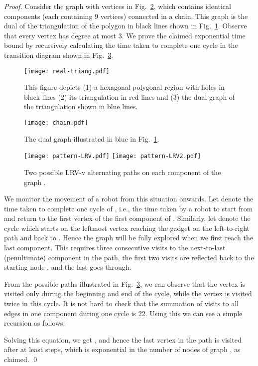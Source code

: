 \begin{proof}
Consider the graph  with  vertices in Fig.~\ref{GD-LRV}, which contains
 identical components (each containing 9 vertices) connected in a chain.
This graph is the dual of the triangulation of the polygon in black lines shown in Fig.~\ref{triang-LRV}.
Observe that every vertex has degree at most 3.
We prove the claimed exponential time bound by recursively calculating the time taken to complete one cycle in the transition
diagram shown in Fig.~\ref{LRV}.

\begin{figure}[t]\centering
\texttt{[image: real-triang.pdf]}
\caption{This figure depicts (1) a hexagonal polygonal region with holes in black lines (2) its triangulation  in red lines
and (3) the dual graph of the triangulation  shown in blue lines.} \label{triang-LRV}
 \end{figure}

\begin{figure}[h]\centering
\texttt{[image: chain.pdf]}
\caption{The dual graph  illustrated in blue in Fig.~\ref{triang-LRV}.} \label{GD-LRV}
 \end{figure}


\begin{figure}[h]\centering
\texttt{[image: pattern-LRV.pdf]}
\texttt{[image: pattern-LRV2.pdf]}
\caption{Two possible LRV-v alternating paths on each component of the graph .} \label{LRV}
 \end{figure}

We monitor the movement of a robot from this situation onwards.
Let  denote the time taken to
complete one cycle of , i.e., the time taken by a robot to start
from and return to the first vertex of the first component of . Similarly,
let  denote the cycle which starts on the leftmost vertex  reaching the  gadget on the left-to-right path
and back to .
Hence the graph will be fully explored when we first reach the last component.
This requires three consecutive visits to the next-to-last (penultimate) component in the path, the first
two visits are reflected back to the starting node , and the last goes through.


From the possible paths illustrated in Fig.~\ref{LRV}, we can observe that the vertex  is visited only during the beginning and
end of the cycle, while the vertex  is visited twice in this cycle. It is not hard to check that the summation of visits to all edges
in one component during one cycle is 22. Using this we can see a simple recursion as follows:

Solving this equation, we get , and hence the last vertex  in the path is visited
after at least  steps, which is exponential in the number  of nodes of graph , as claimed.
\qed
\end{proof}


